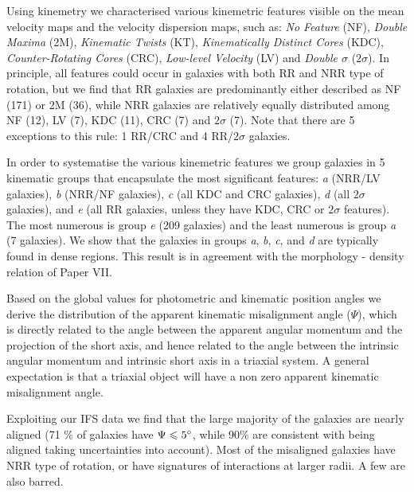 \documentclass[usenatbib,usegraphicx]{mn2e}
\begin{document}
Using kinemetry we characterised various kinemetric features visible on the mean velocity maps and the velocity dispersion maps, such as: {\it No Feature} (NF), {\it Double Maxima} (2M), {\it Kinematic Twists} (KT), {\it Kinematically Distinct Cores} (KDC), {\it Counter-Rotating Cores} (CRC), {\it Low-level Velocity} (LV) and {\it Double $\sigma$} ($2\sigma$). In principle, all features could occur in galaxies with both RR and NRR type of rotation, but we find that RR galaxies are predominantly either described as NF (171) or 2M (36), while NRR galaxies are relatively equally distributed among NF (12), LV (7), KDC (11), CRC (7) and $2\sigma$ (7). Note that there are 5 exceptions to this rule: 1 RR/CRC and 4 RR/$2\sigma$ galaxies. 

In order to systematise the various kinemetric features we group galaxies in 5 kinematic groups that encapsulate the most significant features: {\it a} (NRR/LV galaxies), {\it b} (NRR/NF galaxies), {\it c} (all KDC and CRC galaxies), {\it d} (all $2\sigma$ galaxies), and {\it e} (all RR galaxies, unless they have KDC, CRC or $2\sigma$ features). The most numerous is group {\it e} (209 galaxies) and the least numerous is group {\it a} (7 galaxies). We show that the galaxies in groups {\it a}, {\it b}, {\it c}, and {\it d} are typically found in dense regions. This result is in agreement with the morphology - density relation of Paper VII.

Based on the global values for photometric and kinematic position angles we derive the distribution of the apparent kinematic misalignment angle ($\Psi$), which is directly related to the angle between the apparent angular momentum and the projection of the short axis, and hence related to the angle between the intrinsic angular momentum and intrinsic short axis in a triaxial system. A general expectation is that a triaxial object will have a non zero apparent kinematic misalignment angle. 

Exploiting our IFS data we find that the large majority of the galaxies are nearly aligned (71 \% of galaxies have $\Psi \leqslant 5\hbox{$^\circ$}$, while 90\% are consistent with being aligned taking uncertainties into account). Most of the misaligned galaxies have NRR type of rotation, or have signatures of interactions at larger radii. A few are also barred. 
\end{document}
